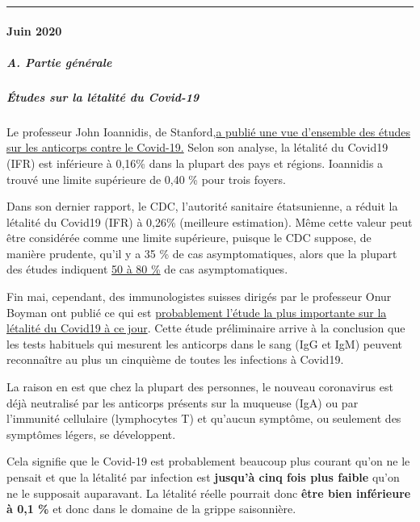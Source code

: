 \begin{center}\rule{0.5\linewidth}{\linethickness}\end{center}

\hypertarget{juin-2020}{%
\paragraph{Juin 2020}\label{juin-2020}}

\hypertarget{a-partie-guxe9nuxe9rale}{%
\subparagraph{\texorpdfstring{\textbf{A. Partie
générale}}{A. Partie générale}}\label{a-partie-guxe9nuxe9rale}}

\hypertarget{uxe9tudes-sur-la-luxe9talituxe9-du-covid-19}{%
\subparagraph{\texorpdfstring{\textbf{Études sur la létalité du
Covid-19}}{Études sur la létalité du Covid-19}}\label{uxe9tudes-sur-la-luxe9talituxe9-du-covid-19}}

Le professeur John Ioannidis, de
Stanford,\href{https://swprs.org/studies-on-covid-19-lethality/}{a
publié une vue d'ensemble des études sur les anticorps contre le
Covid-19.} Selon son analyse, la létalité du Covid19 (IFR) est
inférieure à 0,16\% dans la plupart des pays et régions. Ioannidis a
trouvé une limite supérieure de 0,40 \% pour trois foyers.

Dans son dernier rapport, le CDC, l'autorité sanitaire étatsunienne, a
réduit la létalité du Covid19 (IFR) à 0,26\% (meilleure estimation).
Même cette valeur peut être considérée comme une limite supérieure,
puisque le CDC suppose, de manière prudente, qu'il y a 35 \% de cas
asymptomatiques, alors que la plupart des études indiquent
\href{https://www.bmj.com/content/369/bmj.m1375}{50 à 80 \%} de cas
asymptomatiques.

Fin mai, cependant, des immunologistes suisses dirigés par le professeur
Onur Boyman ont publié ce qui est
\href{https://swprs.org/coronavirus-antibody-tests-show-only-one-fifth-of-infections/}{probablement
l'étude la plus importante sur la létalité du Covid19 à ce jour}. Cette
étude préliminaire arrive à la conclusion que les tests habituels qui
mesurent les anticorps dans le sang (IgG et IgM) peuvent reconnaître au
plus un cinquième de toutes les infections à Covid19.

La raison en est que chez la plupart des personnes, le nouveau
coronavirus est déjà neutralisé par les anticorps présents sur la
muqueuse (IgA) ou par l'immunité cellulaire (lymphocytes T) et qu'aucun
symptôme, ou seulement des symptômes légers, se développent.

Cela signifie que le Covid-19 est probablement beaucoup plus courant
qu'on ne le pensait et que la létalité par infection est \textbf{jusqu'à
cinq fois plus faible} qu'on ne le supposait auparavant. La létalité
réelle pourrait donc \textbf{être bien inférieure à 0,1 \%} et donc dans
le domaine de la grippe saisonnière.


